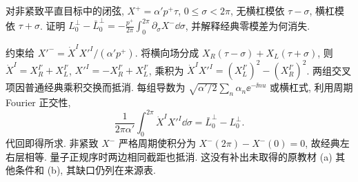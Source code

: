 \begin{exercise}
对非紧致平直目标中的闭弦, $X^+=\alpha'p^+\tau$, $0\leq\sigma<2\pi$, 无横杠模依 $\tau-\sigma$, 横杠模依 $\tau+\sigma$. 证明
$L_0^\perp-\bar L_0^\perp=-\frac{p^+}{2\pi}\int_0^{2\pi}\partial_\sigma X^-\dd\sigma$, 并解释经典零模差为何消失.
\end{exercise}
\begin{solution}
约束给 $X'^-=\dot X^IX'^I/(\alpha'p^+)$. 将横向场分成 $X_R(\tau-\sigma)+X_L(\tau+\sigma)$, 则
$\dot X^I=X_R^{I\prime}+X_L^{I\prime}$,
$X'^I=-X_R^{I\prime}+X_L^{I\prime}$, 乘积为
$\dot X^IX'^I=(X_L^{I\prime})^2-(X_R^{I\prime})^2$.
两组交叉项因普通经典乘积交换而抵消. 每组导数为
$\sqrt{\alpha'/2}\sum_n\alpha_n\ee^{-\ii nu}$ 或横杠式, 利用周期 Fourier 正交性,
\[
 \frac1{2\pi\alpha'}\int_0^{2\pi}\dot X^IX'^I\dd\sigma
 =\bar L_0^\perp-L_0^\perp.
\]
代回即得所求. 非紧致 $X^-$ 严格周期使积分为 $X^-(2\pi)-X^-(0)=0$, 故经典左右层相等. 量子正规序时两边相同截距也抵消. 这没有补出未取得的原教材 (a) 其他条件和 (b), 其缺口仍列在来源表.
\end{solution}
